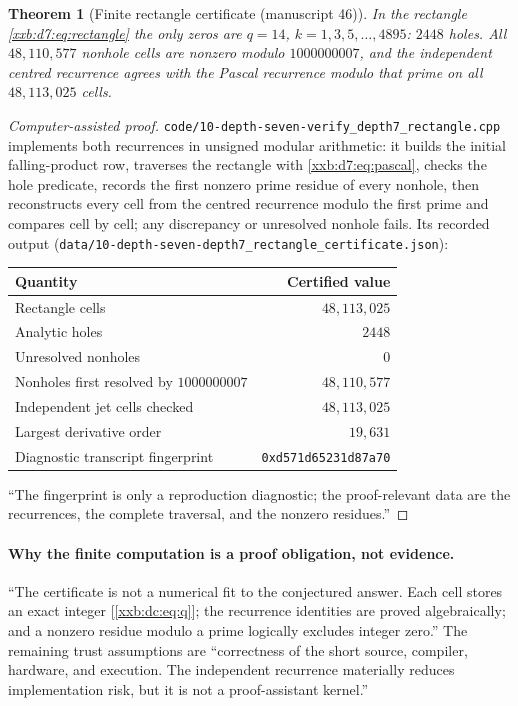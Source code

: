 \documentclass[11pt,a4paper]{article}
\numberwithin{equation}{section}
\newtheorem{theorem}{Theorem}[section]
\theoremstyle{definition}
\theoremstyle{remark}
\theoremstyle{plain}
\begin{document}
\begin{theorem}[Finite rectangle certificate (manuscript 46)]\label{xxb:d7:thm:finite}
In the rectangle \eqref{xxb:d7:eq:rectangle} the only zeros are $q=14$,
$k=1,3,5,\ldots,4895$: $2448$ holes.  All $48{,}110{,}577$ nonhole cells are
nonzero modulo $1000000007$, and the independent centred recurrence agrees with
the Pascal recurrence modulo that prime on all $48{,}113{,}025$ cells.
\end{theorem}
\begin{proof}[Computer-assisted proof]
\texttt{code/10-depth-\allowbreak seven-\allowbreak verify\_depth7\_rectangle.cpp}
implements both recurrences in unsigned modular arithmetic: it builds the
initial falling-product row, traverses the rectangle with
\eqref{xxb:d7:eq:pascal}, checks the hole predicate, records the first nonzero
prime residue of every nonhole, then reconstructs every cell from the centred
recurrence modulo the first prime and compares cell by cell; any discrepancy or
unresolved nonhole fails.  Its recorded output
(\texttt{data/10-depth-\allowbreak seven-\allowbreak depth7\_rectangle\_certificate.json}):

\begin{center}
\small
\begin{tabular}{@{}lr@{}}
\toprule
Quantity & Certified value\\
\midrule
Rectangle cells & $48{,}113{,}025$\\
Analytic holes & $2448$\\
Unresolved nonholes & $0$\\
Nonholes first resolved by $1000000007$ & $48{,}110{,}577$\\
Independent jet cells checked & $48{,}113{,}025$\\
Largest derivative order & $19{,}631$\\
Diagnostic transcript fingerprint & \texttt{0xd571d65231d87a70}\\
\bottomrule
\end{tabular}
\end{center}
``The fingerprint is only a reproduction diagnostic; the proof-relevant data
are the recurrences, the complete traversal, and the nonzero residues.''
\end{proof}

\paragraph{Why the finite computation is a proof obligation, not evidence.}
``The certificate is not a numerical fit to the conjectured answer.  Each cell
stores an exact integer [\eqref{xxb:dc:eq:q}]; the recurrence identities are
proved algebraically; and a nonzero residue modulo a prime logically excludes
integer zero.''  The remaining trust assumptions are ``correctness of the short
source, compiler, hardware, and execution.  The independent recurrence
materially reduces implementation risk, but it is not a proof-assistant
kernel.''
\end{document}
